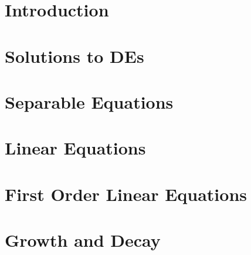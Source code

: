 \documentclass{beamer}
\begin{document}
\part{Introduction}



\part{Solutions to DEs}



\part{Separable Equations}






\part{Linear Equations}



\part{First Order Linear Equations}



\part{Growth and Decay}


\end{document}
